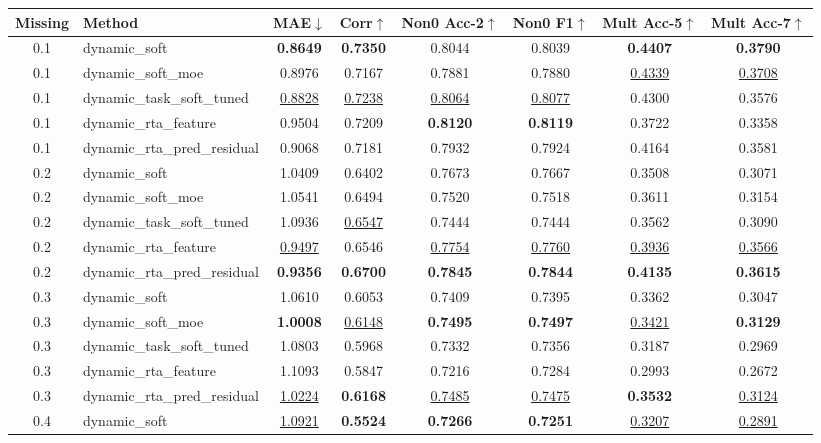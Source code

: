 \begin{table}[t]
\centering
\small
\begin{tabular}{c l c c c c c c}
\toprule
Missing & Method & MAE$\downarrow$ & Corr$\uparrow$ & Non0 Acc-2$\uparrow$ & Non0 F1$\uparrow$ & Mult Acc-5$\uparrow$ & Mult Acc-7$\uparrow$ \\ 
\midrule
0.1 & dynamic_soft & \textbf{0.8649} & \textbf{0.7350} & 0.8044 & 0.8039 & \textbf{0.4407} & \textbf{0.3790} \\ 
0.1 & dynamic_soft_moe & 0.8976 & 0.7167 & 0.7881 & 0.7880 & \underline{0.4339} & \underline{0.3708} \\ 
0.1 & dynamic_task_soft_tuned & \underline{0.8828} & \underline{0.7238} & \underline{0.8064} & \underline{0.8077} & 0.4300 & 0.3576 \\ 
0.1 & dynamic_rta_feature & 0.9504 & 0.7209 & \textbf{0.8120} & \textbf{0.8119} & 0.3722 & 0.3358 \\ 
0.1 & dynamic_rta_pred_residual & 0.9068 & 0.7181 & 0.7932 & 0.7924 & 0.4164 & 0.3581 \\ 
0.2 & dynamic_soft & 1.0409 & 0.6402 & 0.7673 & 0.7667 & 0.3508 & 0.3071 \\ 
0.2 & dynamic_soft_moe & 1.0541 & 0.6494 & 0.7520 & 0.7518 & 0.3611 & 0.3154 \\ 
0.2 & dynamic_task_soft_tuned & 1.0936 & \underline{0.6547} & 0.7444 & 0.7444 & 0.3562 & 0.3090 \\ 
0.2 & dynamic_rta_feature & \underline{0.9497} & 0.6546 & \underline{0.7754} & \underline{0.7760} & \underline{0.3936} & \underline{0.3566} \\ 
0.2 & dynamic_rta_pred_residual & \textbf{0.9356} & \textbf{0.6700} & \textbf{0.7845} & \textbf{0.7844} & \textbf{0.4135} & \textbf{0.3615} \\ 
0.3 & dynamic_soft & 1.0610 & 0.6053 & 0.7409 & 0.7395 & 0.3362 & 0.3047 \\ 
0.3 & dynamic_soft_moe & \textbf{1.0008} & \underline{0.6148} & \textbf{0.7495} & \textbf{0.7497} & \underline{0.3421} & \textbf{0.3129} \\ 
0.3 & dynamic_task_soft_tuned & 1.0803 & 0.5968 & 0.7332 & 0.7356 & 0.3187 & 0.2969 \\ 
0.3 & dynamic_rta_feature & 1.1093 & 0.5847 & 0.7216 & 0.7284 & 0.2993 & 0.2672 \\ 
0.3 & dynamic_rta_pred_residual & \underline{1.0224} & \textbf{0.6168} & \underline{0.7485} & \underline{0.7475} & \textbf{0.3532} & \underline{0.3124} \\ 
0.4 & dynamic_soft & \underline{1.0921} & \textbf{0.5524} & \textbf{0.7266} & \textbf{0.7251} & \underline{0.3207} & \underline{0.2891} \\ 

\end{tabular}
\end{table}
